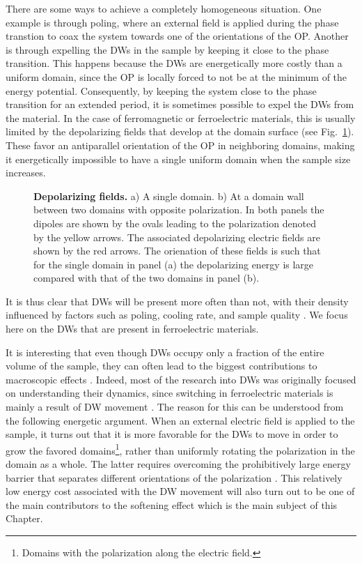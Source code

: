 There are some ways to achieve a completely homogeneous situation. One example is through poling, where an external field is applied during the phase transtion to coax the system towards one of the orientations of the OP.
Another is through expelling the DWs in the sample by keeping it close to the phase transition.
This happens because the DWs are energetically more costly than a uniform domain, since the OP is locally forced to not be at the minimum of the energy potential.
Consequently, by keeping the system close to the phase transition for an extended period, it is sometimes possible to expel the DWs from the material. 
In the case of ferromagnetic or ferroelectric materials, this is usually limited by the depolarizing fields that develop at the domain surface (see Fig.~\ref{fig:BTO_depolarizing_schematic}).
These favor an antiparallel orientation of the OP in neighboring domains, making it energetically impossible to have a single uniform domain when the sample size increases.
\begin{figure}[h]
	\caption{\label{fig:BTO_depolarizing_schematic}{\bf Depolarizing fields.} a) A single domain. b) At a domain wall between two domains with opposite polarization. In both panels the dipoles are shown by the ovals leading to the polarization denoted by the yellow arrows. The associated depolarizing electric fields are shown by the red arrows. The orienation of these fields is such that for the single domain in panel (a) the depolarizing energy is large compared with that of the two domains in panel (b).}    
\end{figure}
It is thus clear that DWs will be present more often than not, with their density influenced by factors such as poling, cooling rate, and sample quality \cite{Griffin2012,Shen2018,Nataf2020}.
We focus here on the DWs that are present in ferroelectric materials.

It is interesting that even though DWs occupy only a fraction of the entire volume of the sample, they can often lead to the biggest contributions to macroscopic effects \cite{Schranz2012}. 
Indeed, most of the research into DWs was originally focused on understanding their dynamics, since switching in ferroelectric materials is mainly a result of DW movement \cite{Merz1954,Gao2013}.
The reason for this can be understood from the following energetic argument.
When an external electric field is applied to the sample, it turns out that it is more favorable for the DWs to move in order to grow the favored domains\footnote{Domains with the polarization along the electric field.}, rather than uniformly rotating the polarization in the domain as a whole.
The latter requires overcoming the prohibitively large energy barrier that separates different orientations of the polarization \cite{Tagantsev2010}.
This relatively low energy cost associated with the DW movement will also turn out to be one of the main contributors to the softening effect which is the main subject of this Chapter.


